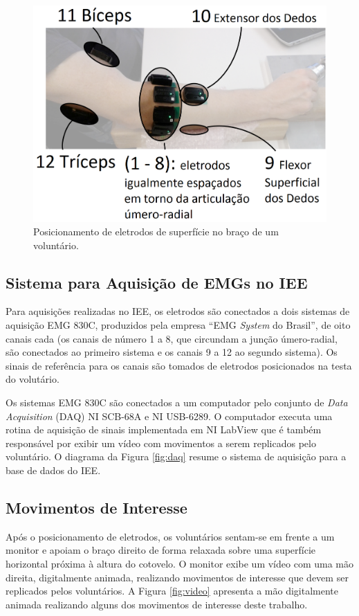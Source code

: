 \begin{figure}[htb]
	\caption{\label{fig:eletrodos}Posicionamento de eletrodos de superfície no braço de um voluntário.}
	\begin{center}
	    \includegraphics[width=0.75\linewidth]{./img/eletrodos.png}
	\end{center}
\end{figure}

			\subsection{Sistema para Aquisição de EMGs no IEE}
Para aquisições realizadas no IEE, os eletrodos são conectados a dois sistemas de aquisição EMG 830C, produzidos pela empresa ``EMG \emph{System} do Brasil'', de oito canais cada (os canais de número 1 a 8, que circundam a junção úmero-radial, são conectados ao primeiro sistema e os canais 9 a 12 ao segundo sistema). Os sinais de referência para os canais são tomados de eletrodos posicionados na testa do volutário.

Os sistemas EMG 830C são conectados a um computador pelo conjunto de \emph{Data Acquisition} (DAQ) NI SCB-68A e NI USB-6289. O computador executa uma rotina de aquisição de sinais implementada em NI LabView que é também responsável por exibir um vídeo com movimentos a serem replicados pelo voluntário. O diagrama da Figura \ref{fig:daq} resume o sistema de aquisição para a base de dados do IEE.



			\subsection{Movimentos de Interesse}
Após o posicionamento de eletrodos, os voluntários sentam-se em frente a um monitor e apoiam o braço direito de forma relaxada sobre uma superfície horizontal próxima à altura do cotovelo. O monitor exibe um vídeo com uma mão direita, digitalmente animada, realizando movimentos de interesse que devem ser replicados pelos voluntários. A Figura \ref{fig:video} apresenta a mão digitalmente animada realizando alguns dos movimentos de interesse deste trabalho.

